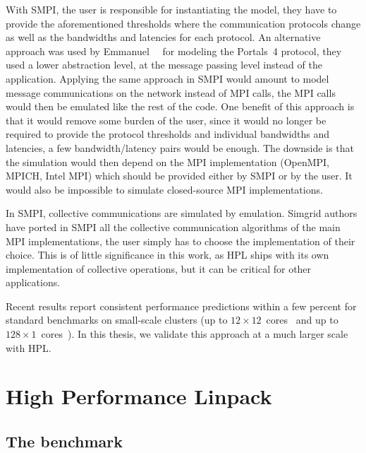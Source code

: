         With SMPI, the user is responsible for instantiating the model, \ie they have to provide the aforementioned
        thresholds where the communication protocols change as well as the bandwidths and latencies for each protocol.
        An alternative approach was used by Emmanuel~\etal~\cite{emmanuel:hal-02972297} for modeling the Portals~4
        protocol, they used a lower abstraction level, at the message passing level instead of the application. Applying
        the same approach in SMPI would amount to model message communications on the network instead of MPI calls, the
        MPI calls would then be emulated like the rest of the code. One benefit of this approach is that it would remove
        some burden of the user, since it would no longer be required to provide the protocol thresholds and individual
        bandwidths and latencies, a few bandwidth/latency pairs would be enough. The downside is that the simulation
        would then depend on the MPI implementation (\eg OpenMPI, MPICH, Intel MPI) which should be provided either by
        SMPI or by the user. It would also be impossible to simulate closed-source MPI implementations.

        In SMPI, collective communications are simulated by emulation. Simgrid authors have ported in SMPI all the
        collective communication algorithms of the main MPI implementations, the user simply has to choose the
        implementation of their choice. This is of little significance in this work, as HPL ships with its own
        implementation of collective operations, but it can be critical for other applications.

        Recent results report consistent performance predictions within a few percent for standard benchmarks on
        small-scale clusters (up to \(12\times12\) cores~\cite{heinrich:hal-01523608} and up to
        \(128\times1\) cores~\cite{smpi}). In this thesis, we validate this approach at a much larger scale with HPL.

\chapter{High Performance Linpack}%
\label{chapter:prediction:hpl}

    \section{The benchmark}%
    \label{sec:hpl:benchmark}

